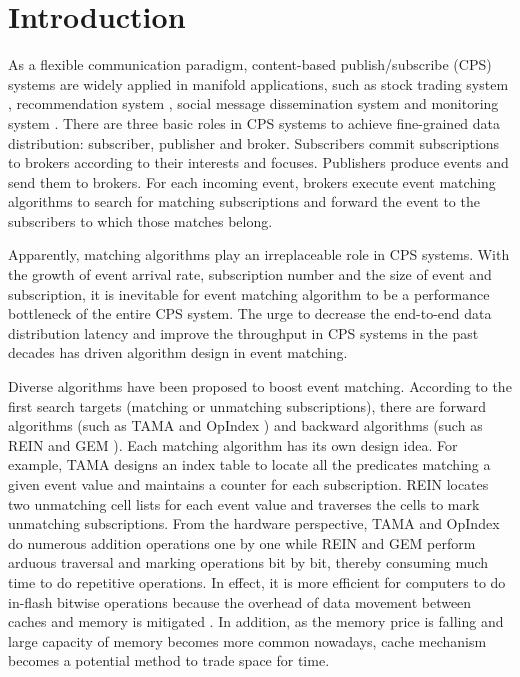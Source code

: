 \documentclass[runningheads]{llncs}
\begin{document}

\section{Introduction}
\label{intro}
As a flexible communication paradigm, content-based publish/subscribe (CPS) systems are widely applied in manifold applications, such as stock trading system \cite{2010Efficient} \cite{2014Elastic}, recommendation system \cite{2010Efficiently}, social message dissemination system \cite{2020Topk} and monitoring system \cite{A-Tree}. There are three basic roles in CPS systems to achieve fine-grained data distribution: subscriber, publisher and broker. Subscribers commit subscriptions to brokers according to their interests and focuses. Publishers produce events and send them to brokers. For each incoming event, brokers execute event matching algorithms to search for matching subscriptions and forward the event to the subscribers to which those matches belong.

Apparently, matching algorithms play an irreplaceable role in CPS systems. With the growth of event arrival rate, subscription number and the size of event and subscription, it is inevitable for event matching algorithm to be a performance bottleneck of the entire CPS system. The urge to decrease the end-to-end data distribution latency and improve the throughput in CPS systems in the past decades has driven algorithm design in event matching.

Diverse algorithms have been proposed to boost event matching. According to the first search targets (matching or unmatching subscriptions), there are forward algorithms (such as TAMA \cite{TAMA} and OpIndex \cite{OpIndex}) and backward algorithms (such as REIN \cite{REIN} and GEM \cite{GEM}). 
Each matching algorithm has its own design idea. For example,
TAMA \cite{TAMA} designs an index table to locate all the predicates matching a given event value and maintains a counter for each subscription. REIN \cite{REIN} locates two unmatching cell lists for each event value and traverses the cells to mark unmatching subscriptions. 
From the hardware perspective, TAMA and OpIndex do numerous addition operations one by one while REIN and GEM perform arduous traversal and marking operations bit by bit, thereby consuming much time to do repetitive operations. In effect, it is more efficient for computers to do in-flash bitwise operations because the overhead of data movement between caches and memory is mitigated \cite{ParaBit}. In addition, as the memory price is falling and large capacity of memory becomes more common nowadays, cache mechanism becomes a potential method to trade space for time.
\end{document}
